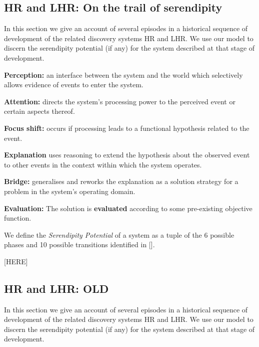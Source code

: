 \subsection{{\sf HR} and {\sf LHR}: On the trail of serendipity} \label{sec:pursuit}
In this section we give an account of several episodes in a historical sequence of development of the related discovery systems {\sf HR} and {\sf LHR}. We use our model to discern the serendipity potential (if any) for the system described at that stage of development.

{\bf Perception:} an interface between the system and the world which selectively allows
evidence of events to enter the system.

{\bf Attention:} directs the system’s processing power to the perceived event or certain aspects
thereof.

{\bf Focus shift:} occurs if processing leads to a functional hypothesis related to the event.

{\bf Explanation} uses reasoning to extend the hypothesis about the observed event to other
events in the context within which the system operates.

{\bf Bridge:}  generalises and reworks
the explanation as a solution strategy for a problem in the system's
operating domain.

{\bf Evaluation:} The solution is
\textbf{evaluated} according to some pre-existing objective function.

We define the {\em Serendipity Potential} of a system as a tuple of the 6 possible phases and 10 possible transitions identified in []. 




[HERE]
\subsection{{\sf HR} and {\sf LHR}: OLD}
In this section we give an account of several episodes in a historical sequence of development of the related discovery systems {\sf HR} and {\sf LHR}. We use our model to discern the serendipity potential (if any) for the system described at that stage of development.

